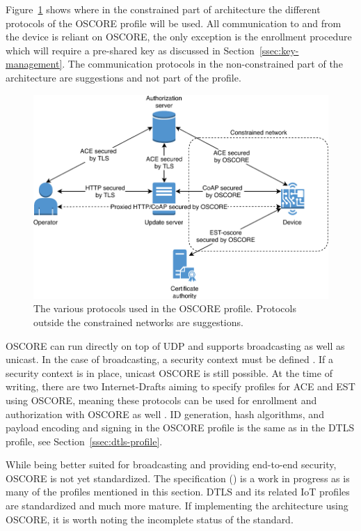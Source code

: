 \documentclass[0-thesis.tex]{subfiles}
\begin{document}
Figure~\ref{fig:oscore-profile} shows where in the constrained part of architecture the
different protocols of the OSCORE profile will be used. All communication to and from the
device is reliant on OSCORE, the only exception is the enrollment procedure which will
require a pre-shared key as discussed in Section~\ref{ssec:key-management}. The
communication protocols in the non-constrained part of the architecture are suggestions
and not part of the profile. 

\begin{figure}
    \caption{The various protocols used in the OSCORE profile. Protocols outside the constrained networks are suggestions.}
    \label{fig:oscore-profile}
    \includegraphics{images/oscore-profile.pdf}
\end{figure}

OSCORE can run directly on top of UDP and supports broadcasting as well as unicast. In the
case of broadcasting, a security context must be defined \parencite{oscore-group}. If a
security context is in place, unicast OSCORE is still possible. At the time of writing,
there are two Internet-Drafts aiming to specify profiles for ACE and EST using OSCORE,
meaning these protocols can be used for enrollment and authorization with OSCORE as well
\parencite{ace-oscore, est-oscore}. ID generation, hash algorithms, and payload encoding
and signing in the OSCORE profile is the same as in the DTLS profile, see
Section~\ref{ssec:dtls-profile}.

While being better suited for broadcasting and providing end-to-end security, OSCORE is
not yet standardized. The specification (\parencite{oscore}) is a work in progress as is
many of the profiles mentioned in this section. DTLS and its related IoT profiles are
standardized and much more mature. If implementing the architecture using OSCORE, it is
worth noting the incomplete status of the standard.
\end{document}
